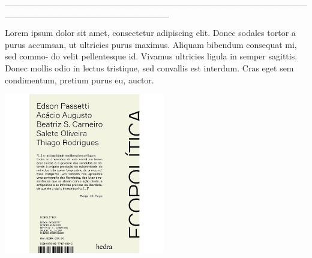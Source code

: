 \hspace*{-2cm}\_\_\_\_\_\_\_\_\_\_\_\_\_\_\_\_\_\_\_\_\_\_\_\_\_\_\_\_\_\_\_\_\_\_\_\_\_\_\_\_\_\_\_\_\_\_\_\_\_\_\_\_\_\_\_\_\_\_\_\_\_\_\_\_\_\_\_\_\_\_\_\_\_\_

\medskip

\noindent{}Lorem ipsum dolor sit amet, consectetur adipiscing elit.
Donec sodales tortor a purus accumsan, ut ultricies purus
maximus. Aliquam bibendum consequat mi, sed commo-
do velit pellentesque id. Vivamus ultricies ligula in semper
sagittis. Donec mollis odio in lectus tristique, sed convallis
est interdum. Cras eget sem condimentum, pretium purus
eu, auctor.

\hspace{.5cm}

\hspace*{-.4cm}\begin{minipage}[c]{0.90\linewidth}
\small{
{}}
\end{minipage}

\pagebreak

\hspace{.5cm}

\begin{center}
\hspace*{-1cm}
\hspace*{1cm}\includegraphics[width=70mm]{eco.jpeg}
\end{center}

